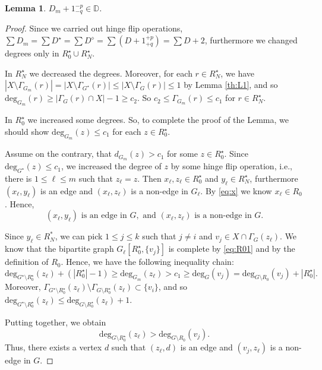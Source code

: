 \documentclass[11pt]{elsarticle}
\theoremstyle{plain}
\newtheorem{lemma}[theorem]{Lemma}
\theoremstyle{definition}
\def\mD{\mathbb{D}}
\def\deg{\mathrm{deg}}
\begin{document}
\begin{lemma}\label{lm:marad}
$D_m+1^{-p}_{-q}\in \mD$.
\end{lemma}
\begin{proof}
Since we carried out hinge flip operations, $\sum D_m=\sum D^\star=\sum D^\diamond=\sum (D+1^{+p}_{+q})=\sum D+2$, furthermore we changed degrees  only in $R^\star_0\cup R^\star_N$.

\medskip\noindent
In $R^\star_N$ we decreased the degrees. Moreover, for each $r\in R^\star_N$, we have $|X\setminus \Gamma_{G_m}(r)|=|X\setminus \Gamma_{G^\star}(r)|\le |X\setminus \Gamma_{G}(r)|\le 1$ by Lemma \ref{th:L1}, and so $\deg_{G_m}(r)\ge |\Gamma_G(r)\cap X|-1\ge c_2$. So $c_2\le \Gamma_{G_m}(r)\le c_1$ for $r\in R_N^\star$.

\medskip\noindent
In $R^\star_0$ we increased some degrees. So, to complete the proof of the Lemma, we should show $\deg_{G_{m}}(z)\le c_1$ for each $z\in R^\star_0$.

Assume on the contrary, that $d_{G_m}(z)>c_1$ for some $z\in R^\star_0$. Since $\deg_{G^\star}(z)\le c_1$, we increased the degree of $z$  by some   hinge flip operation, i.e.,  there is $1\le \ell\le m$ such that $z_\ell=z.$ Then $x_\ell, z_\ell \in R^\star_0$ and $y_\ell \in R^\star_N$, furthermore $(x_\ell, y_\ell)$ is an edge and $(x_\ell, z_\ell)$ is a non-edge in $G_{\ell}$. By \eqref{eq:x} we know $x_\ell\in R_0$. Hence,
\begin{equation}\label{eq:EN1}
(x_\ell, y_\ell) \text{ is an edge in } G, \text{ and } (x_\ell, z_\ell) \text{ is a non-edge in } G.
\end{equation}

\medskip\noindent
Since $y_\ell\in R^*_N$, we can pick  $1\le j\le k$ such that $j\ne i$ and $v_j\in X \cap \Gamma_G(z_\ell)$. We know that the bipartite graph $G_\ell[R^\star_0,\{v_{j}\}]$ is complete by \eqref{eq:R01} and by the definition of $R_0$. Hence, we have the following inequality chain:
\begin{displaymath}
\deg_{G^\star\setminus R^\star_0}(z_\ell)+(|R^\star_0|-1)\ge \deg_{G_m}(z_\ell)>c_1\ge \deg_G(v_{j})= \deg_{G\setminus R_0}(v_{j})+|R^\star_0|.
\end{displaymath}
Moreover,
$\Gamma_{G^\star\setminus R^\star_0}(z_\ell)\setminus \Gamma_{G\setminus R^\star_0}(z_\ell)\subset \{v_i\}$,
and so $\deg_{G^\star\setminus R^\star_0}(z_\ell)\le \deg_{G\setminus R^\star_0}(z_\ell)+1.$

Putting together, we obtain
\begin{displaymath}
    \deg_{G\setminus R^\star_0}(z_\ell)>\deg_{G\setminus R_0}(v_{j}).
\end{displaymath}
Thus,  there exists a vertex $d$ such that $(z_\ell,d)$ is an edge and
$(v_{j},z_\ell)$ is a non-edge in $G$.


\end{proof}
\end{document}
